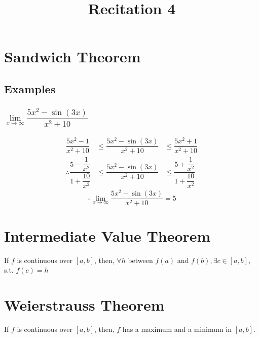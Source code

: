 \documentclass[fleqn]{article}
\title{Recitation 4}
\author{}
\date{\formatdate{14}{11}{2014}}
\begin{document}
	
\maketitle
	
\tableofcontents
	
\newpage
\section{Sandwich Theorem}
	
\subsection{Examples}

\subsubsection{$\lim\limits_{x \rightarrow \infty} \dfrac{5x^2 - \sin(3x)}{x^2 + 10}$}

\begin{align*}
	\dfrac{5x^2 - 1}{x^2 + 10} &\leq \dfrac{5x^2 - \sin(3x)}{x^2 + 10} &\leq \dfrac{5x^2 + 1}{x^2 + 10} \\
	\therefore \dfrac{5 - \dfrac{1}{x^2}}{1 + \dfrac{10}{x^2}} &\leq \dfrac{5x^2 - \sin(3x)}{x^2 + 10} &\leq \dfrac{5 + \dfrac{1}{x^2}}{1 + \dfrac{10}{x^2}}
\end{align*}
\begin{equation*}
	\therefore \lim\limits_{x \rightarrow \infty} \dfrac{5x^2 - \sin(3x)}{x^2 + 10} = 5
\end{equation*}

\section{Intermediate Value Theorem}

If $f$ is continuous over $[a, b]$, then, $\forall h$ between $f(a)$ and $f(b), \exists c \in [a, b]$, s.t. $f(c) = h$

\section{Weierstrauss Theorem}

If $f$ is continuous over $[a, b]$, then, $f$ has a maximum and a minimum in $[a, b]$.
\end{document}

